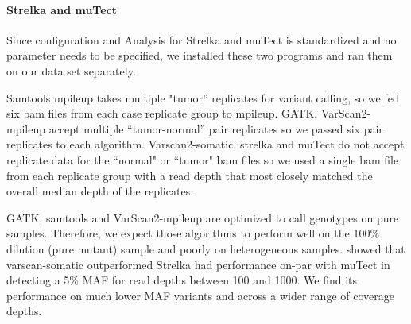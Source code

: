 \documentclass[11pt,reqno]{amsart}
\begin{document}
\paragraph{\textbf{Strelka and muTect}}
Since configuration and Analysis for Strelka and muTect is standardized and no parameter needs to be specified, we installed these two programs and ran them on our data set separately. 

Samtools mpileup takes multiple "tumor'' replicates for variant calling, so we fed six bam files from each case replicate group to mpileup. GATK, VarScan2-mpileup accept multiple ``tumor-normal'' pair replicates so we passed six pair replicates to each algorithm. Varscan2-somatic, strelka and muTect do not accept replicate data for the ``normal" or ``tumor" bam files so we used a single bam file from each replicate group with a read depth that most closely matched the overall median depth of the replicates.

GATK, samtools and VarScan2-mpileup are optimized to call genotypes on pure samples. Therefore, we expect those algorithms to perform well on the 100\% dilution (pure mutant) sample and poorly on heterogeneous samples. \citet{Stead:2013fu} showed that varscan-somatic outperformed Strelka had performance on-par with muTect in detecting a 5\% MAF for read depths between 100 and 1000. We find its performance on much lower MAF variants and across a wider range of coverage depths. 


\end{document}
